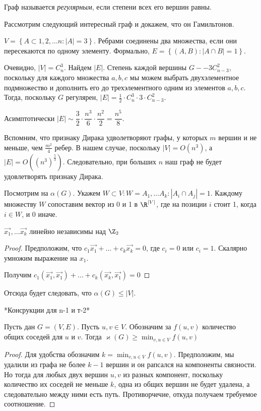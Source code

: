 \begin{Def}
	Граф называется \emph{регулярным}, если степени всех его вершин равны.
\end{Def}

Рассмотрим следующий интересный граф и докажем, что он Гамильтонов.

$ V = \left\lbrace A \subset {1, 2, \ldots n} : |A| = 3 \right\rbrace $. Ребрами соединены два множества, если они пересекаются по одному элементу. Формально, $ E = \left\lbrace (A, B) : |A\cap B| = 1\right\rbrace  $.

Очевидно, $ |V| = C_n^3 $. Найдем $  |E| $. Степень каждой вершины $  G -- 3 C_{n - 3}^2$, поскольку для каждого множества $ {a, b, c} $ мы можем выбрать двухэлементное подмножество и дополнить его до трехэлементного одним из элементов $ {a, b, c} $. Тогда, поскольку $  G $ регулярен,  $ |E| = \frac{1}{2} \cdot C_n^3 \cdot 3 \cdot  C_{n - 3}^2 $.

Асимптотически $ |E| \sim \dfrac{3}{2} \cdot \dfrac{n^3}{6} \cdot \dfrac{n^2}{2} =\dfrac{n^5}{8} $.

Вспомним, что признаку Дирака удволетворяют графы, у которых $ m $ вершин и не меньше, чем $ \frac{m^2}{4} $ ребер.
В нашем случае, поскольку $|V| = O(n^3)$, а $|E| = O((n^3)^{\frac{5}{3}}) $. Следовательно, при больших $ n $ наш граф не будет удовлетворять признаку Дирака.

Посмотрим на $ \alpha(G) $. Укажем $ W \subset V : W = {A_1, \ldots A_k} : |A_i \cap A_j| = 1 $.
Каждому множеству $ W $ сопоставим вектор из 0 и 1 в $ \R^{|V|} $, где на позиции $ i $ стоит 1, когда $ i \in W $, и 0 иначе.

\begin{lemma}
	$ \vec{x_1}, \ldots \vec{x_k} $ линейно независимы над $ \Z_2 $
\end{lemma}  

\begin{proof}
	Предположим, что $ c_1 \vec{x_1} + \ldots + c_k \vec{x_k} = 0 $, где $ c_i = 0 $ или $ c_i = 1 $.
	Скалярно умножим выражение на $ x_1 $.
	
	Получим $ c_1 (\vec{x_1}, \vec{x_1}) + \ldots + c_k (\vec{x_k}, \vec{x_1}) = 0$
\end{proof}

Отсюда будет следовать, что $ \alpha(G) \leqslant |V| $.


*Консрукции для n-1 и т-2*

\begin{lemma}
	Пусть дан $ G = (V, E) $. Пусть $ u, v \in V $. Обозначим за $ f(u, v) $ количество общих соседей для $ u $ и $ v $. Тогда $ \varkappa(G) \geqslant \min_{v, u \in V} f(u, v) $
\end{lemma}
 \begin{proof}
 	Для удобства обозначим $ k = \min_{v, u \in V} f(u, v) $.
 	Предположим, мы удалили из графа не более $ k - 1 $ вершин и он рапсался на компоненты связности. Но тогда для любых двух вершин $ u, v $ из разных компонент, поскольку количество их соседей не меньше $ k $, одна из общих вершин не будет удалена, а следовательно между ними есть путь. Противорчечие, откуда получаем требуемое соотношение.
 \end{proof}

